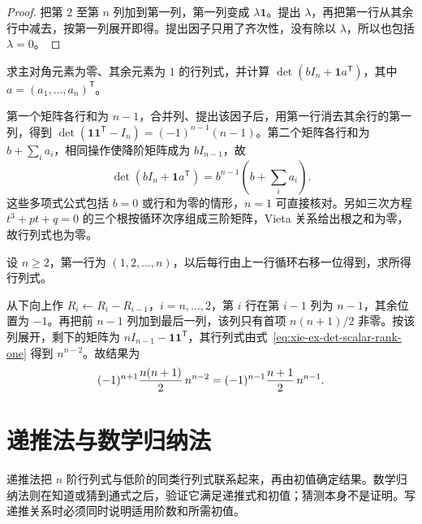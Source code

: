 \begin{proof}
把第 $2$ 至第 $n$ 列加到第一列，第一列变成 $\lambda\mathbf1$。提出 $\lambda$，再把第一行从其余行中减去，按第一列展开即得。提出因子只用了齐次性，没有除以 $\lambda$，所以也包括 $\lambda=0$。
\end{proof}

\begin{example}
\label{ex:xie-ex-det-equal-sums}
求主对角元素为零、其余元素为 $1$ 的行列式，并计算 $\det(bI_n+\mathbf1a^{\mathsf T})$，其中 $a=(a_1,\ldots,a_n)^{\mathsf T}$。
\end{example}

\begin{solve}
第一个矩阵各行和为 $n-1$，合并列、提出该因子后，用第一行消去其余行的第一列，得到 $\det(\mathbf1\mathbf1^{\mathsf T}-I_n)=(-1)^{n-1}(n-1)$。第二个矩阵各行和为 $b+\sum_i a_i$，相同操作使降阶矩阵成为 $bI_{n-1}$，故
\begin{equation}
\label{eq:xie-ex-det-scalar-rank-one}
\det(bI_n+\mathbf1a^{\mathsf T})=b^{n-1}\left(b+\sum_i a_i\right).
\end{equation}
这些多项式公式包括 $b=0$ 或行和为零的情形，$n=1$ 可直接核对。另如三次方程 $t^3+pt+q=0$ 的三个根按循环次序组成三阶矩阵，Vieta 关系给出根之和为零，故行列式也为零。
\end{solve}

\begin{example}
\label{ex:xie-ex-det-cyclic-rows}
设 $n\geq2$，第一行为 $(1,2,\ldots,n)$，以后每行由上一行循环右移一位得到，求所得行列式。
\end{example}

\begin{solve}
从下向上作 $R_i\leftarrow R_i-R_{i-1}$，$i=n,\ldots,2$，第 $i$ 行在第 $i-1$ 列为 $n-1$，其余位置为 $-1$。再把前 $n-1$ 列加到最后一列，该列只有首项 $n(n+1)/2$ 非零。按该列展开，剩下的矩阵为 $nI_{n-1}-\mathbf1\mathbf1^{\mathsf T}$，其行列式由式~\eqref{eq:xie-ex-det-scalar-rank-one} 得到 $n^{n-2}$。故结果为
\[
(-1)^{n+1}\frac{n(n+1)}2\,n^{n-2}
=(-1)^{n-1}\frac{n+1}{2}\,n^{n-1}.\qedhere
\]
\end{solve}

\section{递推法与数学归纳法}
\label{sec:xie-ex-det-recurrence}

递推法把 $n$ 阶行列式与低阶的同类行列式联系起来，再由初值确定结果。数学归纳法则在知道或猜到通式之后，验证它满足递推式和初值；猜测本身不是证明。写递推关系时必须同时说明适用阶数和所需初值。

